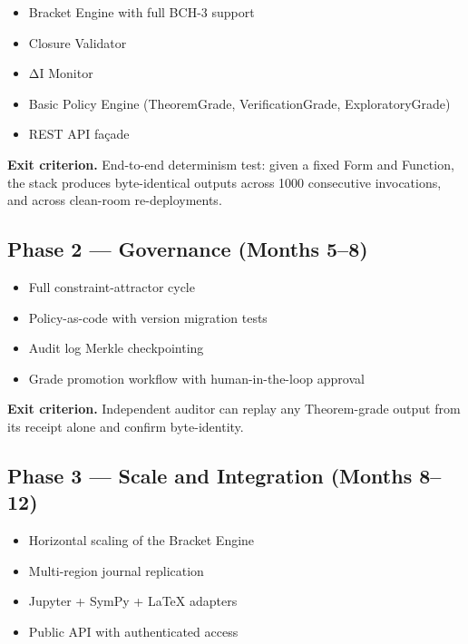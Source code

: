 \documentclass[11pt,a4paper]{article}
\providecommand{\tightlist}{\setlength{\itemsep}{0pt}\setlength{\parskip}{0pt}}
\begin{document}
\begin{itemize}
\tightlist
\item
  Bracket Engine with full BCH-3 support
\item
  Closure Validator
\item
  ΔI Monitor
\item
  Basic Policy Engine (TheoremGrade, VerificationGrade,
  ExploratoryGrade)
\item
  REST API façade
\end{itemize}

\textbf{Exit criterion.} End-to-end determinism test: given a fixed Form
and Function, the stack produces byte-identical outputs across 1000
consecutive invocations, and across clean-room re-deployments.

\hypertarget{phase-2-governance-months-58}{%
\subsection{Phase 2 --- Governance (Months
5--8)}\label{phase-2-governance-months-58}}

\begin{itemize}
\tightlist
\item
  Full constraint-attractor cycle
\item
  Policy-as-code with version migration tests
\item
  Audit log Merkle checkpointing
\item
  Grade promotion workflow with human-in-the-loop approval
\end{itemize}

\textbf{Exit criterion.} Independent auditor can replay any
Theorem-grade output from its receipt alone and confirm byte-identity.

\hypertarget{phase-3-scale-and-integration-months-812}{%
\subsection{Phase 3 --- Scale and Integration (Months
8--12)}\label{phase-3-scale-and-integration-months-812}}

\begin{itemize}
\tightlist
\item
  Horizontal scaling of the Bracket Engine
\item
  Multi-region journal replication
\item
  Jupyter + SymPy + LaTeX adapters
\item
  Public API with authenticated access
\end{itemize}
\end{document}
